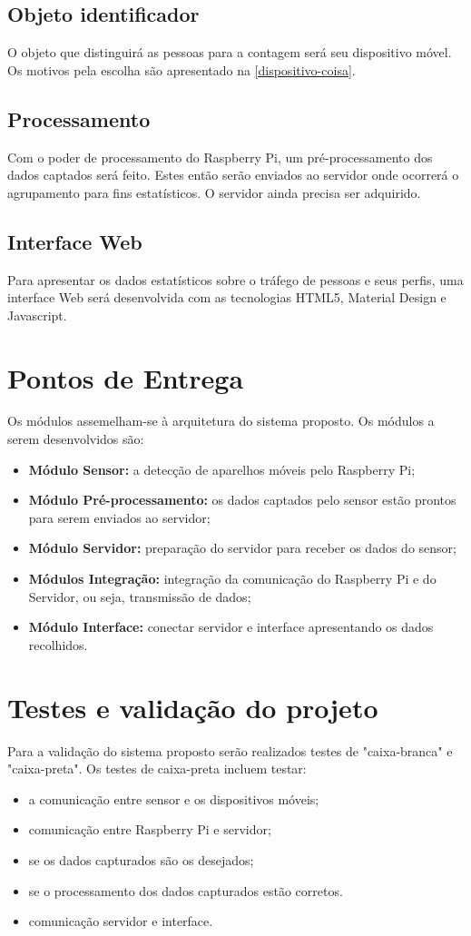 \subsection{Objeto identificador}
O objeto que distinguirá as pessoas para a contagem será seu dispositivo móvel. Os motivos pela escolha são apresentado na \autoref{dispositivo-coisa}.

\subsection{Processamento}
Com o poder de processamento do Raspberry Pi, um pré-processamento dos dados captados será feito. Estes então serão enviados ao servidor onde
ocorrerá o agrupamento para fins estatísticos. O servidor ainda precisa ser adquirido.

\subsection{Interface Web}
Para apresentar os dados estatísticos sobre o tráfego de pessoas e seus perfis, uma interface Web será desenvolvida com as tecnologias
HTML5, Material Design e Javascript.

\section{Pontos de Entrega}
\label{pontos-entrega}
Os módulos assemelham-se à arquitetura do sistema proposto. Os módulos a serem desenvolvidos são:
\begin{itemize}
  \item \textbf{Módulo Sensor:} a detecção de aparelhos móveis pelo Raspberry Pi;
  \item \textbf{Módulo Pré-processamento:} os dados captados pelo sensor estão prontos para serem enviados ao servidor;
  \item \textbf{Módulo Servidor:} preparação do servidor para receber os dados do sensor;
  \item \textbf{Módulos Integração:} integração da comunicação do Raspberry Pi e do Servidor, ou seja, transmissão de dados;
  \item \textbf{Módulo Interface:} conectar servidor e interface apresentando os dados recolhidos.
\end{itemize}

\section{Testes e validação do projeto}
Para a validação do sistema proposto serão realizados testes de "caixa-branca" e "caixa-preta". Os testes de caixa-preta incluem testar:
\begin{itemize}
  \item a comunicação entre sensor e os dispositivos móveis;
  \item comunicação entre Raspberry Pi e servidor;
  \item se os dados capturados são os desejados;
  \item se o processamento dos dados capturados estão corretos.
  \item comunicação servidor e interface.
\end{itemize}

